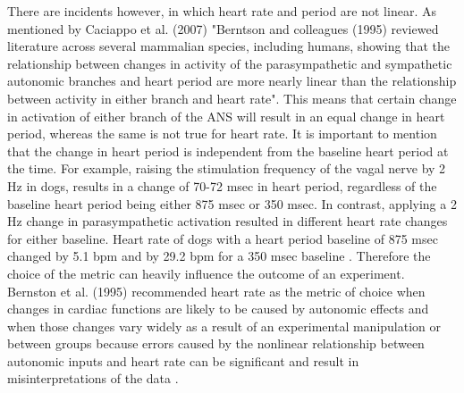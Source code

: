 There are incidents however, in which heart rate and period are not linear. As mentioned by Caciappo et al. (2007) "Berntson and colleagues (1995) reviewed literature across several mammalian species, including humans, showing that the relationship between changes in activity of the parasympathetic and sympathetic autonomic branches and heart period are more nearly linear than the relationship between activity in either branch and heart rate". This means that certain change in activation of either branch of the ANS will result in an equal change in heart period, whereas the same is not true for heart rate. It is important to mention that the change in heart period is independent from the baseline heart period at the time. For example,  raising the stimulation frequency of the vagal nerve by 2 Hz in dogs, results in a change of 70-72 msec in heart period, regardless of the baseline heart period being either 875 msec or 350 msec. In contrast, applying a 2 Hz change in parasympathetic activation resulted in different heart rate changes for either baseline. Heart rate of dogs with a heart period baseline of 875 msec changed by 5.1 bpm and by 29.2 bpm for a 350 msec baseline \citep{HANDBOOKPP}. Therefore the choice of the metric can heavily influence the outcome of an experiment. Bernston et al. (1995) recommended heart rate as the metric of choice when changes in cardiac functions are likely to be caused by autonomic effects and when those changes vary widely as a result of an experimental manipulation or between groups because errors caused by the nonlinear relationship between autonomic inputs and heart rate can be significant and result in misinterpretations of the data \citep{HANDBOOKPP}.

